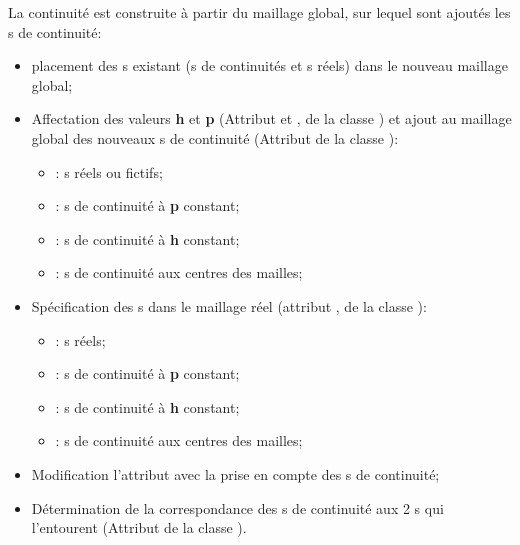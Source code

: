       La continuité est construite à partir du maillage global, sur lequel sont ajoutés les \n s de continuité:
      \begin{itemize}
       \item placement des \n s existant (\n s de continuités et \n s réels) dans le nouveau maillage global;
        
       \item Affectation des valeurs \textbf{h} et \textbf{p} (Attribut  et , de la classe \MESH)
       et ajout au maillage global des nouveaux \n s de continuité (Attribut  de la classe \MESH):
	\begin{itemize}
	\item[\ding{213}] : \n s réels ou fictifs;
	\item[\ding{213}] : \n s de continuité à \textbf{p} constant;
	\item[\ding{213}] : \n s de continuité à \textbf{h} constant;
	\item[\ding{213}] : \n s de continuité aux centres des mailles;
	\end{itemize}
       \vspace{0.3cm}
       \item Spécification des \n s dans le maillage réel (attribut , de la classe \MESH):
	\begin{itemize}
	  \item[\ding{213}] : \n s réels;
	  \item[\ding{213}] : \n s de continuité à \textbf{p} constant;
	  \item[\ding{213}] : \n s de continuité à \textbf{h} constant;
	  \item[\ding{213}] : \n s de continuité aux centres des mailles;
	\end{itemize}
       \vspace{0.3cm}
       \item Modification l'attribut  avec la prise en compte des \n s de continuité;
       \item Détermination de la correspondance des \n s de continuité aux 2 \n s qui l'entourent 
       (Attribut  de la classe \MESH).
      \end{itemize}

